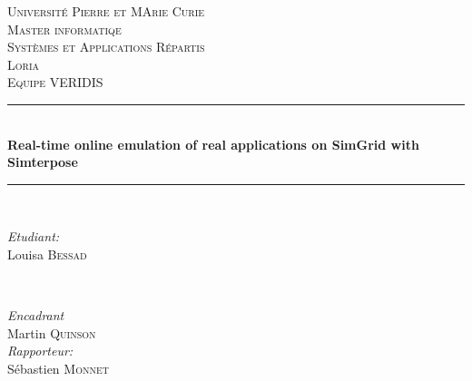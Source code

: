 \documentclass[a4paper,12pt]{article}
\begin{document}
\begin{titlepage}

\newcommand{\HRule}{\rule{\linewidth}{0.5mm}} %

\center %
 

\textsc{\LARGE Université Pierre et MArie Curie}\\[0.44cm] %
\textsc{\Large Master informatiqe}\\[0.44cm] %
\textsc{\large Systèmes et Applications Répartis}\\[1.44cm] %

\textsc{\LARGE Loria}\\[0.44cm] %
\textsc{\Large Equipe VERIDIS}\\[1.44cm] %


\HRule \\[0.4cm]
{ \huge \bfseries Real-time online emulation of real applications on SimGrid with Simterpose}\\[0.4cm] %
\HRule \\[1.44cm]
 

\begin{minipage}{0.4\textwidth}
\begin{flushleft} \large
\emph{Etudiant:}\\
Louisa \textsc{Bessad} %
\end{flushleft}
\end{minipage}
~
\begin{minipage}{0.4\textwidth}
\begin{flushright} \large
\emph{Encadrant} \\
Martin \textsc{Quinson} %
\\\vspace{1.44cm} \emph{Rapporteur:} \\ Sébastien
\textsc{Monnet}
\end{flushright}
\end{minipage}\\[2cm]


\end{titlepage}
\end{document}
